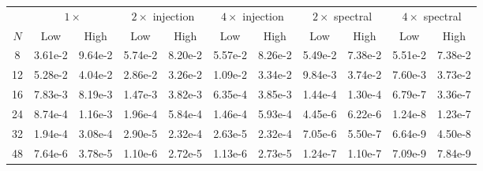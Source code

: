 \begin{table}[htpb]
\begin{tabular}{c|cc|cc|cc|cc|cc|}
 & \multicolumn{2}{c|}{$1 \times$} 
 & \multicolumn{2}{c|}{$2 \times$ \: injection}
 & \multicolumn{2}{c|}{$4 \times$ \: injection}
 & \multicolumn{2}{c|}{$2 \times$ \: spectral}
 & \multicolumn{2}{c|}{$4 \times$ \: spectral} \\
 $N$ & Low & High & Low & High & Low & High & Low & High & Low & High \\
 \hline
 8  & 3.61e-2 & 9.64e-2
    & 5.74e-2 & 8.20e-2
    & 5.57e-2 & 8.26e-2
    & 5.49e-2 & 7.38e-2
    & 5.51e-2 & 7.38e-2
    \\
 12 & 5.28e-2 & 4.04e-2
    & 2.86e-2 & 3.26e-2
    & 1.09e-2 & 3.34e-2
    & 9.84e-3 & 3.74e-2
    & 7.60e-3 & 3.73e-2
    \\
 16 & 7.83e-3 & 8.19e-3
    & 1.47e-3 & 3.82e-3
    & 6.35e-4 & 3.85e-3
    & 1.44e-4 & 1.30e-4
    & 6.79e-7 & 3.36e-7
    \\
 24 & 8.74e-4 & 1.16e-3
    & 1.96e-4 & 5.84e-4
    & 1.46e-4 & 5.93e-4
    & 4.45e-6 & 6.22e-6
    & 1.24e-8 & 1.23e-7
    \\
 32 & 1.94e-4 & 3.08e-4
    & 2.90e-5 & 2.32e-4
    & 2.63e-5 & 2.32e-4
    & 7.05e-6 & 5.50e-7
    & 6.64e-9 & 4.50e-8
    \\
 48 & 7.64e-6 & 3.78e-5
    & 1.10e-6 & 2.72e-5
    & 1.13e-6 & 2.73e-5
    & 1.24e-7 & 1.10e-7
    & 7.09e-9 & 7.84e-9
\end{tabular}
\end{table}

